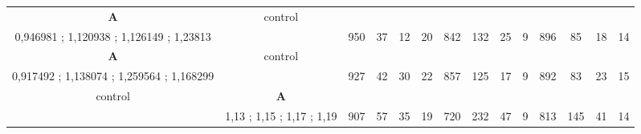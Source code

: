 \begin{table}[]
{\begin{tabular}{|c|c|c|c|c|c|c|c|c|c|c|c|c|c|}
\cellcolor{blue!15}\textbf{A} & control& {\color[HTML]{00009B} } & {\color[HTML]{9A0000} } & {\color[HTML]{009901} } &  & {\color[HTML]{00009B} } & {\color[HTML]{9A0000} } & {\color[HTML]{009901} } &  & {\color[HTML]{00009B} } & {\color[HTML]{9A0000} } & {\color[HTML]{009901} } &  \\ 
\cellcolor{ blue!15}0,946981 ; 1,120938 ; 1,126149 ; 1,23813 &  & \multirow{-2}{*}{{\color[HTML]{00009B} 950}} & \multirow{-2}{*}{{\color[HTML]{9A0000} 37}} & \multirow{-2}{*}{{\color[HTML]{009901} 12}} & \multirow{-2}{*}{20} & \multirow{-2}{*}{{\color[HTML]{00009B} 842}} & \multirow{-2}{*}{{\color[HTML]{9A0000} 132}} & \multirow{-2}{*}{{\color[HTML]{009901} 25}} & \multirow{-2}{*}{9} & \multirow{-2}{*}{{\color[HTML]{00009B} 896}} & \multirow{-2}{*}{{\color[HTML]{9A0000} 85}} & \multirow{-2}{*}{{\color[HTML]{009901} 18}} & \multirow{-2}{*}{14} \\ \hline

\cellcolor{blue!15}\textbf{A} & control& {\color[HTML]{00009B} } & {\color[HTML]{9A0000} } & {\color[HTML]{009901} } &  & {\color[HTML]{00009B} } & {\color[HTML]{9A0000} } & {\color[HTML]{009901} } &  & {\color[HTML]{00009B} } & {\color[HTML]{9A0000} } & {\color[HTML]{009901} } &  \\ 
\cellcolor{ blue!15}0,917492 ; 1,138074 ; 1,259564 ; 1,168299 &  & \multirow{-2}{*}{{\color[HTML]{00009B} 927}} & \multirow{-2}{*}{{\color[HTML]{9A0000} 42}} & \multirow{-2}{*}{{\color[HTML]{009901} 30}} & \multirow{-2}{*}{22} & \multirow{-2}{*}{{\color[HTML]{00009B} 857}} & \multirow{-2}{*}{{\color[HTML]{9A0000} 125}} & \multirow{-2}{*}{{\color[HTML]{009901} 17}} & \multirow{-2}{*}{9} & \multirow{-2}{*}{{\color[HTML]{00009B} 892}} & \multirow{-2}{*}{{\color[HTML]{9A0000} 83}} & \multirow{-2}{*}{{\color[HTML]{009901} 23}} & \multirow{-2}{*}{15} \\ \hline

control & \cellcolor{blue!15}\textbf{A}& {\color[HTML]{00009B} } & {\color[HTML]{9A0000} } & {\color[HTML]{009901} } &  & {\color[HTML]{00009B} } & {\color[HTML]{9A0000} } & {\color[HTML]{009901} } &  & {\color[HTML]{00009B} } & {\color[HTML]{9A0000} } & {\color[HTML]{009901} } &  \\ 
 & \cellcolor{ blue!15}1,13 ; 1,15 ; 1,17 ; 1,19 & \multirow{-2}{*}{{\color[HTML]{00009B} 907}} & \multirow{-2}{*}{{\color[HTML]{9A0000} 57}} & \multirow{-2}{*}{{\color[HTML]{009901} 35}} & \multirow{-2}{*}{19} & \multirow{-2}{*}{{\color[HTML]{00009B} 720}} & \multirow{-2}{*}{{\color[HTML]{9A0000} 232}} & \multirow{-2}{*}{{\color[HTML]{009901} 47}} & \multirow{-2}{*}{9} & \multirow{-2}{*}{{\color[HTML]{00009B} 813}} & \multirow{-2}{*}{{\color[HTML]{9A0000} 145}} & \multirow{-2}{*}{{\color[HTML]{009901} 41}} & \multirow{-2}{*}{14} \\ \hline


\end{tabular}}
\end{table}
